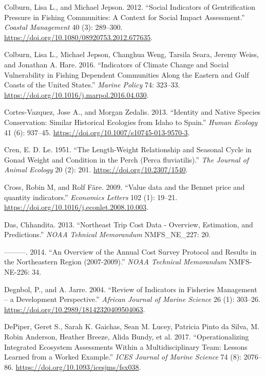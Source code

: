 \documentclass[
]{book}
\begin{document}
\leavevmode\hypertarget{ref-colburn_social_2012}{}%
Colburn, Lisa L., and Michael Jepson. 2012. ``Social Indicators of Gentrification Pressure in Fishing Communities: A Context for Social Impact Assessment.'' \emph{Coastal Management} 40 (3): 289--300. \url{https://doi.org/10.1080/08920753.2012.677635}.

\leavevmode\hypertarget{ref-colburn_indicators_2016}{}%
Colburn, Lisa L., Michael Jepson, Changhua Weng, Tarsila Seara, Jeremy Weiss, and Jonathan A. Hare. 2016. ``Indicators of Climate Change and Social Vulnerability in Fishing Dependent Communities Along the Eastern and Gulf Coasts of the United States.'' \emph{Marine Policy} 74: 323--33. \url{https://doi.org/10.1016/j.marpol.2016.04.030}.

\leavevmode\hypertarget{ref-cortes-vazquez_identity_2013}{}%
Cortes-Vazquez, Jose A., and Morgan Zedalis. 2013. ``Identity and Native Species Conservation: Similar Historical Ecologies from Idaho to Spain.'' \emph{Human Ecology} 41 (6): 937--45. \url{https://doi.org/10.1007/s10745-013-9570-3}.

\leavevmode\hypertarget{ref-Cren1951a}{}%
Cren, E. D. Le. 1951. ``The Length-Weight Relationship and Seasonal Cycle in Gonad Weight and Condition in the Perch (Perca fluviatilis).'' \emph{The Journal of Animal Ecology} 20 (2): 201. \url{https://doi.org/10.2307/1540}.

\leavevmode\hypertarget{ref-Cross2009}{}%
Cross, Robin M, and Rolf Färe. 2009. ``Value data and the Bennet price and quantity indicators.'' \emph{Economics Letters} 102 (1): 19--21. \url{https://doi.org/10.1016/j.econlet.2008.10.003}.

\leavevmode\hypertarget{ref-das_chhandita_northeast_2013}{}%
Das, Chhandita. 2013. ``Northeast Trip Cost Data - Overview, Estimation, and Predictions.'' \emph{NOAA Tehnical Memorandum} NMFS\_NE\_227: 20.

\leavevmode\hypertarget{ref-das_chhandita_overview_2014}{}%
---------. 2014. ``An Overview of the Annual Cost Survey Protocol and Results in the Northeastern Region (2007-2009).'' \emph{NOAA Technical Memorandum} NMFS-NE-226: 34.

\leavevmode\hypertarget{ref-degnbol_review_2004}{}%
Degnbol, P., and A. Jarre. 2004. ``Review of Indicators in Fisheries Management -- a Development Perspective.'' \emph{African Journal of Marine Science} 26 (1): 303--26. \url{https://doi.org/10.2989/18142320409504063}.

\leavevmode\hypertarget{ref-depiper_operationalizing_2017}{}%
DePiper, Geret S., Sarah K. Gaichas, Sean M. Lucey, Patricia Pinto da Silva, M. Robin Anderson, Heather Breeze, Alida Bundy, et al. 2017. ``Operationalizing Integrated Ecosystem Assessments Within a Multidisciplinary Team: Lessons Learned from a Worked Example.'' \emph{ICES Journal of Marine Science} 74 (8): 2076--86. \url{https://doi.org/10.1093/icesjms/fsx038}.
\end{document}

